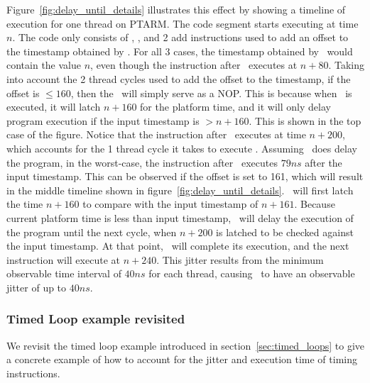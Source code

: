 Figure~\ref{fig:delay_until_details} illustrates this effect by showing a timeline of execution for one thread on PTARM. 
The code segment starts executing at time $n$. 
The code only consists of \gettime, \delayuntil, and 2 add instructions used to add an offset to the timestamp obtained by \gettime.
For all 3 cases, the timestamp obtained by \gettime\ would contain the value $n$, even though the instruction after \gettime\ executes at $n+80$.
Taking into account the 2 thread cycles used to add the offset to the timestamp, if the offset is $\leq 160$, then the \delayuntil\ will simply serve as a NOP. 
This is because when \delayuntil\ is executed, it will latch $n+160$ for the platform time, and it will only delay program execution if the input timestamp is $> n+160$.
This is shown in the top case of the figure.
Notice that the instruction after \delayuntil\ executes at time $n+200$, which accounts for the 1 thread cycle it takes to execute \delayuntil.
Assuming \delayuntil\ does delay the program, in the worst-case, the instruction after \delayuntil\ executes $79 ns$ after the input timestamp. 
This can be observed if the offset is set to 161, which will result in the middle timeline shown in figure~\ref{fig:delay_until_details}.  
\Delayuntil\ will first latch the time $n+160$ to compare with the input timestamp of $n+161$. 
Because current platform time is less than input timestamp, \delayuntil\ will delay the execution of the program until the next cycle, when $n+200$ is latched to be checked against the input timestamp. 
At that point, \delayuntil\ will complete its execution, and the next instruction will execute at $n+240$.
This jitter results from the minimum observable time interval of $40 ns$ for each thread, causing \delayuntil\ to have an observable jitter of up to $40 ns$. 

\subsubsection{Timed Loop example revisited}
We revisit the timed loop example introduced in section~\ref{sec:timed_loops} to give a concrete example of how to account for the jitter and execution time of timing instructions.      
   
